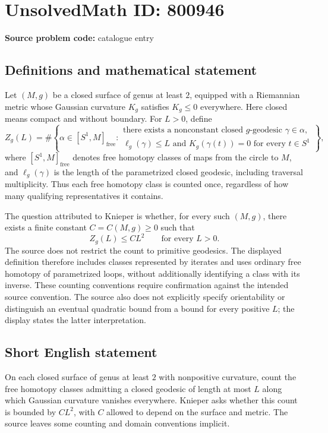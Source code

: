 \documentclass[11pt]{article}
\begin{document}
\section*{UnsolvedMath ID: 800946}
\textbf{Source problem code:} catalogue entry
\subsection{Definitions and mathematical statement}
Let \((M,g)\) be a closed surface of genus at least \(2\), equipped with a Riemannian metric whose Gaussian curvature \(K_g\) satisfies \(K_g\leq 0\) everywhere. Here closed means compact and without boundary. For \(L>0\), define
\[
Z_g(L)=\#\left\{\alpha\in [S^1,M]_{\mathrm{free}}:\begin{array}{l}
\text{there exists a nonconstant closed }g\text{-geodesic }\gamma\in\alpha,\\
\ell_g(\gamma)\leq L\text{ and }K_g(\gamma(t))=0\text{ for every }t\in S^1
\end{array}\right\},
\]
where \([S^1,M]_{\mathrm{free}}\) denotes free homotopy classes of maps from the circle to \(M\), and \(\ell_g(\gamma)\) is the length of the parametrized closed geodesic, including traversal multiplicity. Thus each free homotopy class is counted once, regardless of how many qualifying representatives it contains.

The question attributed to Knieper is whether, for every such \((M,g)\), there exists a finite constant \(C=C(M,g)\geq 0\) such that
\[
Z_g(L)\leq C L^2\qquad\text{for every }L>0.
\]
The source does not restrict the count to primitive geodesics. The displayed definition therefore includes classes represented by iterates and uses ordinary free homotopy of parametrized loops, without additionally identifying a class with its inverse. These counting conventions require confirmation against the intended source convention. The source also does not explicitly specify orientability or distinguish an eventual quadratic bound from a bound for every positive \(L\); the display states the latter interpretation.
\subsection{Short English statement}
On each closed surface of genus at least \(2\) with nonpositive curvature, count the free homotopy classes admitting a closed geodesic of length at most \(L\) along which Gaussian curvature vanishes everywhere. Knieper asks whether this count is bounded by \(C L^2\), with \(C\) allowed to depend on the surface and metric. The source leaves some counting and domain conventions implicit.
\end{document}
